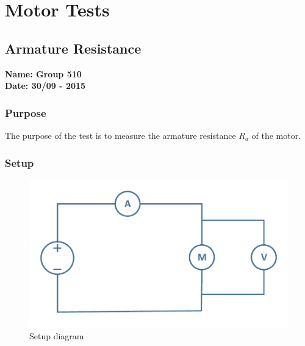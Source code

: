 \pagebreak
\section{Motor Tests} \label{app:motorTests}
\nopagebreak
\subsection{Armature Resistance} %
\textbf{Name: Group 510}\\
\textbf{Date: 30/09 - 2015}

\subsubsection{Purpose}
The purpose of the test is to measure the armature resistance $R_a$ of the motor.

\subsubsection{Setup}
\begin{figure}[H]
  \centering
	\includegraphics[scale=0.5]{figures/MotorTest1.pdf}
	\caption{Setup diagram}
\end{figure}

